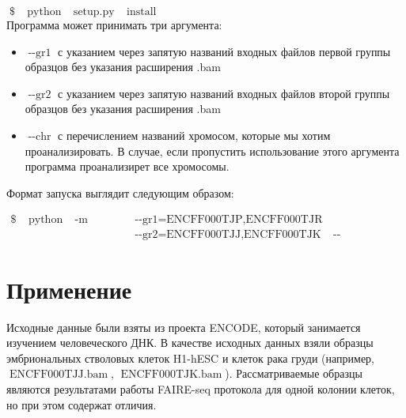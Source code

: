 \documentclass{matmex-diploma-custom}
\begin{document}
$\operatorname{\$\quad python\quad setup.py\quad install}$
\\
Программа может принимать три аргумента: 

\begin{itemize}
  \item $\operatorname{--gr1}$   с указанием через запятую названий входных файлов первой группы образцов без указания расширения .bam   
  \item $\operatorname{--gr2}$   с указанием через запятую названий входных файлов второй группы образцов без указания расширения .bam
  \item $\operatorname{--chr}$   с перечислением названий хромосом, которые мы хотим проанализировать. В случае, если пропустить использование этого аргумента программа проанализирет все хромосомы.
\end{itemize}

Формат запуска выглядит следующим образом:

\begin{equation*}
\begin{split}
\operatorname{\$\quad python\quad -m\quad fairy\quad} & \operatorname{--gr1=ENCFF000TJP,ENCFF000TJR} \\
           & \operatorname{--gr2=ENCFF000TJJ,ENCFF000TJK\quad--chr=chr2,chr3}
\end{split}
\end{equation*}

\section{Применение}
Исходные данные были взяты из проекта ENCODE, который занимается изучением человеческого ДНК.
В качестве исходных данных взяли образцы эмбриональных стволовых клеток H1-hESC и клеток рака груди (например, $\operatorname{ENCFF000TJJ.bam}$, $\operatorname{ENCFF000TJK.bam}$). Рассматриваемые образцы являются результатами работы FAIRE-seq протокола для одной колонии клеток, но при этом содержат отличия.
\end{document}
